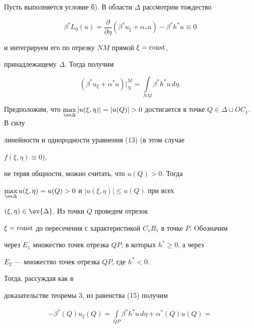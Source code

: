 \begin{pf}


Пусть выполняется условие б). В области $\Delta$ рассмотрим тождество 


$$


\beta^{*}L_0(u)=\frac {\partial }{\partial \eta }(\beta^{*}u_{\xi }


+\alpha_{*}u)-\beta^{*}h^{*}u\equiv 0


$$


и интегрируем его по отрезку $NM$ прямой $\xi=\operatorname{const}$,


принадлежащему $\Delta$. Тогда получим


\begin{equation}


(\beta^{*}u_{\xi}+\alpha^{*}u)\big|_N^M=\int \limits_{NM}\beta 


^{*}h^{*}u\,d\eta.


\end{equation}


Предположим, что $\max \limits_{\ov \Delta }| u(\xi,\eta)| 


=| u(Q)| >0$ достигается в точке $Q\in \Delta \cup OC_1$. В силу 


линейности и однородности уравнения (13) (в этом случае


$f(\xi,\eta)\equiv 0$),


не теряя общности, можно считать, что $u(Q)>0$. Тогда


$\max \limits_{\ov \Delta}


u(\xi,\eta)=u(Q)>0$ и $| u(\xi,\eta)| \le u(Q)$ при всех 


$(\xi,\eta)\in \ov{\Delta}$. Из точки $Q$ проведем отрезок


$\xi=\operatorname{const}$ до пересечения с характеристикой $C_1B_1$ в точке $P$. Oбозначим


через $E_1$ множество точек отрезка $QP$, в которых $h^{*}\ge 0$, а через


$E_2$ --- множество точек отрезка $QP$, где $h^{*}<0$.


Тогда, рассуждая как в


доказательстве теоремы 3, из равенства (15) получим


\begin{multline*}


-\beta^{*}(Q)u_{\xi }(Q)=\int \limits_{QP}\beta^{*}h^{*}u\,d\eta 


+\alpha^{*}(Q)u(Q)= \\


%



\end{multline*}
\end{pf}
